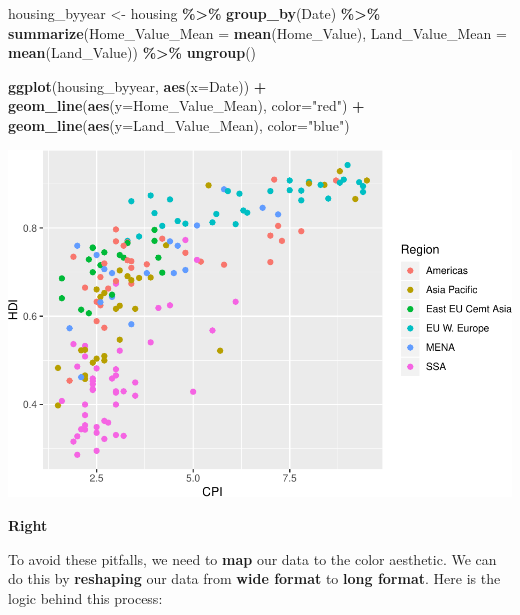 \documentclass[
]{book}
\newenvironment{Shaded}{\begin{snugshade}}{\end{snugshade}}
\newcommand{\DataTypeTok}[1]{\textcolor[rgb]{0.13,0.29,0.53}{#1}}
\newcommand{\KeywordTok}[1]{\textcolor[rgb]{0.13,0.29,0.53}{\textbf{#1}}}
\newcommand{\NormalTok}[1]{#1}
\newcommand{\OperatorTok}[1]{\textcolor[rgb]{0.81,0.36,0.00}{\textbf{#1}}}
\newcommand{\StringTok}[1]{\textcolor[rgb]{0.31,0.60,0.02}{#1}}
\begin{document}
\begin{Shaded}
\begin{Highlighting}[]
\NormalTok{housing\_byyear \textless{}{-}}\StringTok{ }
\StringTok{  }\NormalTok{housing }\OperatorTok{\%\textgreater{}\%}
\StringTok{  }\KeywordTok{group\_by}\NormalTok{(Date) }\OperatorTok{\%\textgreater{}\%}
\StringTok{  }\KeywordTok{summarize}\NormalTok{(}\DataTypeTok{Home\_Value\_Mean =} \KeywordTok{mean}\NormalTok{(Home\_Value),}
            \DataTypeTok{Land\_Value\_Mean =} \KeywordTok{mean}\NormalTok{(Land\_Value)) }\OperatorTok{\%\textgreater{}\%}
\StringTok{  }\KeywordTok{ungroup}\NormalTok{()}

\KeywordTok{ggplot}\NormalTok{(housing\_byyear, }\KeywordTok{aes}\NormalTok{(}\DataTypeTok{x=}\NormalTok{Date)) }\OperatorTok{+}
\StringTok{  }\KeywordTok{geom\_line}\NormalTok{(}\KeywordTok{aes}\NormalTok{(}\DataTypeTok{y=}\NormalTok{Home\_Value\_Mean), }\DataTypeTok{color=}\StringTok{"red"}\NormalTok{) }\OperatorTok{+}
\StringTok{  }\KeywordTok{geom\_line}\NormalTok{(}\KeywordTok{aes}\NormalTok{(}\DataTypeTok{y=}\NormalTok{Land\_Value\_Mean), }\DataTypeTok{color=}\StringTok{"blue"}\NormalTok{)}
\end{Highlighting}
\end{Shaded}

\includegraphics{R/Rgraphics/figures/unnamed-chunk-200-1.pdf}

\textbf{Right}

To avoid these pitfalls, we need to \textbf{map} our data to the color aesthetic.
We can do this by \textbf{reshaping} our data from \textbf{wide format} to \textbf{long format}.
Here is the logic behind this process:
\end{document}
